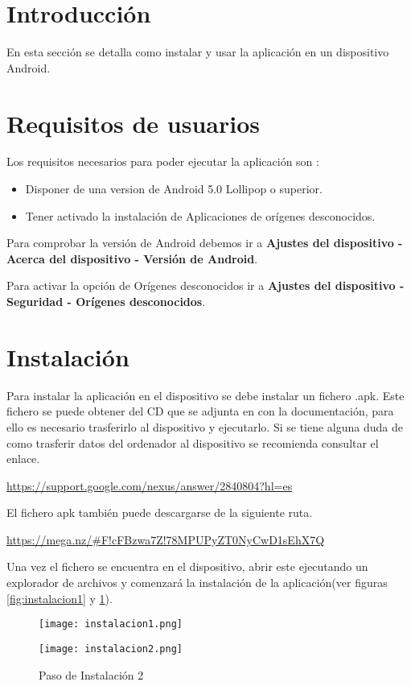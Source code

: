 
\section{Introducción}
En esta sección se detalla como instalar y usar  la aplicación en un dispositivo Android.

\section{Requisitos de usuarios}

Los requisitos necesarios para poder ejecutar la aplicación son : 

\begin{itemize}
 	\item Disponer de una version de Android 5.0 Lollipop o superior.
 	\item Tener activado la instalación de Aplicaciones de orígenes desconocidos\cite{origenesDesconocidos}.
\end{itemize}

Para comprobar la versión de Android debemos ir a \textbf{Ajustes del dispositivo - Acerca del dispositivo  - Versión de Android}.

Para activar la opción de Orígenes desconocidos ir a \textbf{Ajustes del dispositivo - Seguridad  - Orígenes desconocidos}.

\section{Instalación}
Para instalar la aplicación en el dispositivo se debe instalar un fichero .apk\cite{apk}. Este fichero se puede obtener del CD que se adjunta en con la documentación, para ello es necesario trasferirlo al dispositivo y ejecutarlo. Si se tiene alguna duda de como trasferir datos del ordenador al dispositivo se recomienda consultar el enlace.
\begin{center}
	\url{https://support.google.com/nexus/answer/2840804?hl=es} 
\end{center}

El fichero apk también puede descargarse de la siguiente ruta.
\begin{center}
	\url{https://mega.nz/#F!cFBzwa7Z!78MPUPyZT0NyCwD1sEhX7Q}
\end{center}

Una vez el fichero se encuentra en el dispositivo, abrir este ejecutando un explorador de archivos y comenzará la instalación de la aplicación(ver figuras \ref{fig:instalacion1} y \ref{fig:instalacion2}).
\begin{figure}[ht]
		\centering
		\begin{minipage}[b]{0.45\linewidth}
			\texttt{[image: instalacion1.png]}
			\caption{Paso de Instalación 1}
			\label{fig:instalacion1}
	\end{minipage}
	\quad
	\begin{minipage}[b]{0.45\linewidth}
		\texttt{[image: instalacion2.png]}
		\caption{Paso de Instalación 2}
		\label{fig:instalacion2}
		\end{minipage}
	\end{figure}

